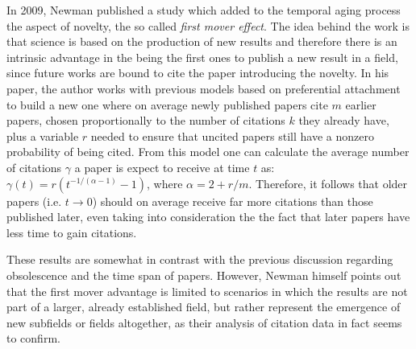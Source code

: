  
In 2009, Newman \cite{0295-5075-86-6-68001} published a study which added to the temporal aging process the aspect of novelty, the so called
\textit{first mover effect}.  The idea behind the work is that science is based on the production of new results and therefore there is an intrinsic advantage in the being the first ones to publish a new result in a field,
since future works are bound to cite the paper introducing the novelty. In his paper, the author works with previous models based on preferential attachment to build a new one where on average newly published papers cite
$m$ earlier papers, chosen proportionally to the number of citations $k$ they already have, plus a variable $r$ needed to ensure
that uncited papers still have a nonzero probability of being cited. From this model one can calculate the average number of citations $\gamma$ a paper is expect to receive at time $t$ as: $\gamma(t) = r(t^{-1/(\alpha - 1)} -1)$, where $\alpha =  2 + r/m$.
Therefore, it follows that older papers (i.e. $t \rightarrow 0$) should on average receive far more citations than
those published later, even taking into consideration the the fact that later
papers have less time to gain citations.

These results are somewhat in contrast with the previous discussion regarding obsolescence and the time span of papers. 
However, Newman himself points out that the first mover advantage is limited to scenarios in which the results
are not part of a  larger, already established field, but rather represent the emergence of new subfields or fields altogether, as their analysis of citation data in fact seems to confirm. 


